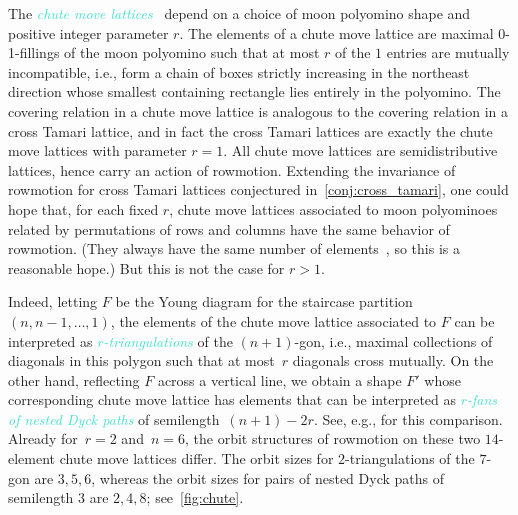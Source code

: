 \documentclass[11pt]{amsart}
\newcommand{\dfn}[1]{\textcolor{Turquoise}{\emph{#1}}}
\theoremstyle{definition}
\begin{document}
The \dfn{chute move lattices}~\cite{rubey2012maximal,axelrodfreed2025chute,billey2025lattice} depend on a choice of moon polyomino shape and positive integer parameter $r$. The elements of a chute move lattice are maximal 0-1-fillings of the moon polyomino such that at most $r$ of the $1$ entries are mutually incompatible, i.e., form a chain of boxes strictly increasing in the northeast direction whose smallest containing rectangle lies entirely in the polyomino. The covering relation in a chute move lattice is analogous to the covering relation in a cross Tamari lattice, and in fact the cross Tamari lattices are exactly the chute move lattices with parameter $r=1$. All chute move lattices are semidistributive lattices, hence carry an action of rowmotion. Extending the invariance of rowmotion for cross Tamari lattices conjectured in~\cref{conj:cross_tamari}, one could hope that, for each fixed $r$, chute move lattices associated to moon polyominoes related by permutations of rows and columns have the same behavior of rowmotion. (They always have the same number of elements~\cite{rubey2011increasing,rubey2012maximal}, so this is a reasonable hope.) But this is not the case for $r>1$.

Indeed, letting $F$ be the Young diagram for the staircase partition $(n,n-1,\ldots,1)$, the elements of the chute move lattice associated to $F$ can be interpreted as \dfn{$r$-triangulations} of the $(n+1)$-gon, i.e., maximal collections of diagonals in this polygon such that at most~$r$ diagonals cross mutually. On the other hand, reflecting $F$ across a vertical line, we obtain a shape $F'$ whose corresponding chute move lattice has elements that can be interpreted as \dfn{$r$-fans of nested Dyck paths} of semilength~$(n+1)-2r$. See, e.g., \cite[Fig.~2]{rubey2012maximal} for this comparison. Already for~$r=2$ and~$n=6$, the orbit structures of rowmotion on these two $14$-element chute move lattices differ. The orbit sizes for $2$-triangulations of the $7$-gon are $3,5,6$, whereas the orbit sizes for pairs of nested Dyck paths of semilength $3$ are $2,4,8$; see~\cref{fig:chute}.
\end{document}
